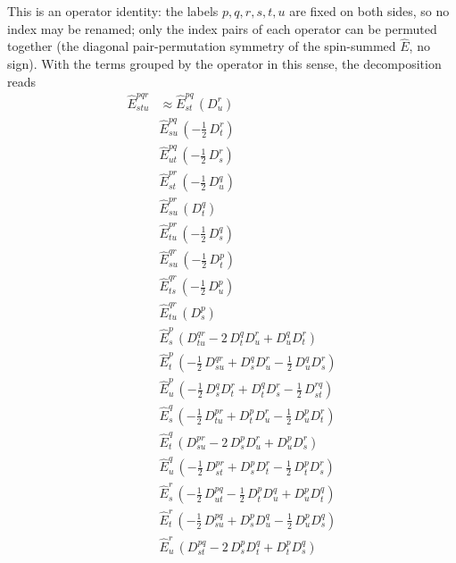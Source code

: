 \documentclass[11pt]{article}
\begin{document}
This is an operator identity: the labels $p,q,r,s,t,u$ are fixed on both sides, so no index may be renamed; only the index pairs of each operator can be permuted together (the diagonal pair-permutation symmetry of the spin-summed $\hat{E}$, no sign).  With the terms grouped by the operator in this sense, the decomposition reads
\begin{align}
\hat{E}^{pqr}_{stu} &\approx \hat{E}^{pq}_{st}\,\left(D^{r}_{u} \right) \\
&\hat{E}^{pq}_{su}\,\left(- \tfrac{1}{2}\, D^{r}_{t} \right) \\
&\hat{E}^{pq}_{ut}\,\left(- \tfrac{1}{2}\, D^{r}_{s} \right) \\
&\hat{E}^{pr}_{st}\,\left(- \tfrac{1}{2}\, D^{q}_{u} \right) \\
&\hat{E}^{pr}_{su}\,\left(D^{q}_{t} \right) \\
&\hat{E}^{pr}_{tu}\,\left(- \tfrac{1}{2}\, D^{q}_{s} \right) \\
&\hat{E}^{qr}_{su}\,\left(- \tfrac{1}{2}\, D^{p}_{t} \right) \\
&\hat{E}^{qr}_{ts}\,\left(- \tfrac{1}{2}\, D^{p}_{u} \right) \\
&\hat{E}^{qr}_{tu}\,\left(D^{p}_{s} \right) \\
&\hat{E}^{p}_{s}\,\left(D^{qr}_{tu}  - 2\, D^{q}_{t} D^{r}_{u}  + D^{q}_{u} D^{r}_{t} \right) \\
&\hat{E}^{p}_{t}\,\left(- \tfrac{1}{2}\, D^{qr}_{su}  + D^{q}_{s} D^{r}_{u}  - \tfrac{1}{2}\, D^{q}_{u} D^{r}_{s} \right) \\
&\hat{E}^{p}_{u}\,\left(- \tfrac{1}{2}\, D^{q}_{s} D^{r}_{t}  + D^{q}_{t} D^{r}_{s}  - \tfrac{1}{2}\, D^{rq}_{st} \right) \\
&\hat{E}^{q}_{s}\,\left(- \tfrac{1}{2}\, D^{pr}_{tu}  + D^{p}_{t} D^{r}_{u}  - \tfrac{1}{2}\, D^{p}_{u} D^{r}_{t} \right) \\
&\hat{E}^{q}_{t}\,\left(D^{pr}_{su}  - 2\, D^{p}_{s} D^{r}_{u}  + D^{p}_{u} D^{r}_{s} \right) \\
&\hat{E}^{q}_{u}\,\left(- \tfrac{1}{2}\, D^{pr}_{st}  + D^{p}_{s} D^{r}_{t}  - \tfrac{1}{2}\, D^{p}_{t} D^{r}_{s} \right) \\
&\hat{E}^{r}_{s}\,\left(- \tfrac{1}{2}\, D^{pq}_{ut}  - \tfrac{1}{2}\, D^{p}_{t} D^{q}_{u}  + D^{p}_{u} D^{q}_{t} \right) \\
&\hat{E}^{r}_{t}\,\left(- \tfrac{1}{2}\, D^{pq}_{su}  + D^{p}_{s} D^{q}_{u}  - \tfrac{1}{2}\, D^{p}_{u} D^{q}_{s} \right) \\
&\hat{E}^{r}_{u}\,\left(D^{pq}_{st}  - 2\, D^{p}_{s} D^{q}_{t}  + D^{p}_{t} D^{q}_{s} \right) \\

\end{align}
\end{document}
